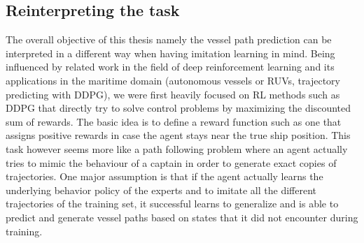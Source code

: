 \subsection{Reinterpreting the task}
The overall objective of this thesis namely the vessel path prediction can be interpreted in a different way when having imitation learning in mind. Being influenced by related work in the field of deep reinforcement learning and its applications in the maritime domain (autonomous vessels or RUVs, trajectory predicting with DDPG), we were first heavily focused on RL methods such as DDPG that directly try to solve control problems by maximizing the discounted sum of rewards. The basic idea is to define a reward function such as one that assigns positive rewards in case the agent stays near the true ship position. This task however seems more like a path following problem where an agent actually tries to mimic the behaviour of a captain in order to generate exact copies of trajectories. One major assumption is that if the agent actually learns the underlying behavior policy of the experts and to imitate all the different trajectories of the training set, it successful learns to generalize and is able to predict and generate vessel paths based on states that it did not encounter during training.
